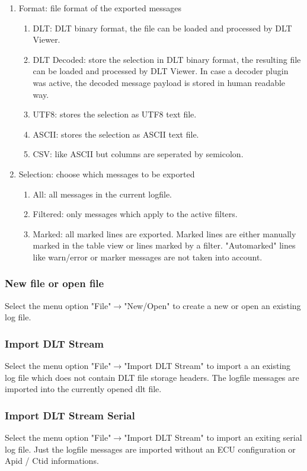 \documentclass[a4paper,11pt]{article}
\begin{document}
\begin{enumerate}
\item Format: file format of the exported messages
  \begin{enumerate}
   \item DLT: DLT binary format, the file can be loaded and processed by DLT Viewer.
   \item DLT Decoded: store the selection in DLT binary format, the resulting file can be loaded and processed
       by DLT Viewer. In case a decoder plugin was active, the decoded message payload is stored in human readable way.
   \item UTF8: stores the selection as UTF8 text file.
   \item ASCII: stores the selection as ASCII text file.
   \item CSV: like ASCII but columns are seperated by semicolon.
 \end{enumerate}
 \item Selection: choose which messages to be exported
  \begin{enumerate}
   \item All: all messages in the current logfile.
   \item Filtered: only messages which apply to the active filters.
   \item Marked: all marked lines are exported. Marked lines are either manually marked in the table view or lines marked by a filter.
        "Automarked" lines like warn/error or marker messages are not taken into account.
  \end{enumerate}
\end{enumerate}

\subsubsection{New file or open file}
Select the menu option "File"\ensuremath{\rightarrow}"New/Open" to create a new or open an existing log file.

\subsubsection{Import DLT Stream}
Select the menu option "File"\ensuremath{\rightarrow}"Import DLT Stream" to import a an existing log file
which does not contain DLT file storage headers.
The logfile messages are imported into the currently opened dlt file.

\subsubsection{Import DLT Stream Serial}
Select the menu option "File"\ensuremath{\rightarrow}"Import DLT Stream" to import an exiting serial log file.
Just the logfile messages are imported without an ECU configuration or Apid / Ctid informations.
\end{document}
